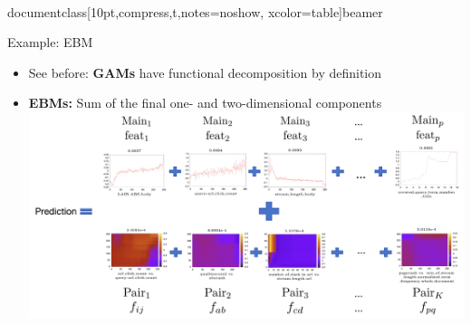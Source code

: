 \\documentclass[10pt,compress,t,notes=noshow, xcolor=table]{beamer}
\begin{document}
\begin{frame}{Example: EBM}

    \begin{itemize}
        \item See before: \textbf{GAMs} have functional decomposition by definition
        \item \textbf{EBMs:} Sum of the final one- and two-dimensional components
        {
        \centering
        \includegraphics[width=\linewidth]{figure/final_ebm.png}
        }
    \end{itemize}
    
\end{frame}



\endlecture
\end{document}
